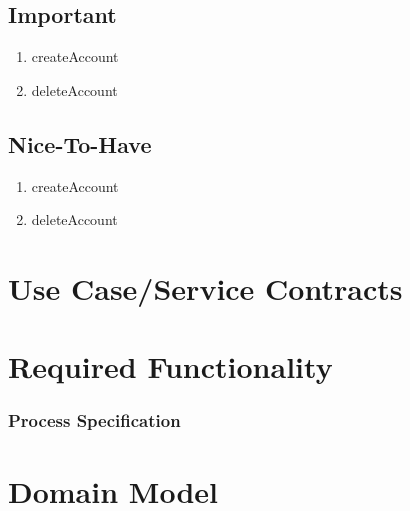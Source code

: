 \documentclass[hidelinks, 12pt, oneside]{article}
\begin{document}
\subsection{Important}
\begin{enumerate}
 \item createAccount
 \\  
 \item deleteAccount
\end{enumerate}
\subsection{Nice-To-Have}
\begin{enumerate}
 \item createAccount
 \\  
 \item deleteAccount
\end{enumerate}
\section{Use Case/Service Contracts}

\section{Required Functionality}

\subsubsection{Process Specification}

\section{Domain Model}
\end{document}
